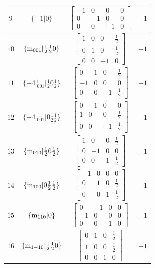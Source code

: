 \documentclass[fleqn,8pt]{jsarticle}
\begin{document}
\begin{longtable}{cccc}
$ 9 $ & $ \{-1|0\} $ & $ \begin{bmatrix} -1 & 0 & 0 & 0 \\ 0 & -1 & 0 & 0 \\ 0 & 0 & -1 & 0 \end{bmatrix} $ & $ -1 $ \\ \hline
$ 10 $ & $ \{{\rm m}_{001}|\frac{1}{2} \frac{1}{2} 0\} $ & $ \begin{bmatrix} 1 & 0 & 0 & \frac{1}{2} \\ 0 & 1 & 0 & \frac{1}{2} \\ 0 & 0 & -1 & 0 \end{bmatrix} $ & $ -1 $ \\ \hline
$ 11 $ & $ \{-4^{+}_{\,\,001}|\frac{1}{2} 0 \frac{1}{2}\} $ & $ \begin{bmatrix} 0 & 1 & 0 & \frac{1}{2} \\ -1 & 0 & 0 & 0 \\ 0 & 0 & -1 & \frac{1}{2} \end{bmatrix} $ & $ -1 $ \\ \hline
$ 12 $ & $ \{-4^{-}_{\,\,001}|0 \frac{1}{2} \frac{1}{2}\} $ & $ \begin{bmatrix} 0 & -1 & 0 & 0 \\ 1 & 0 & 0 & \frac{1}{2} \\ 0 & 0 & -1 & \frac{1}{2} \end{bmatrix} $ & $ -1 $ \\ \hline
$ 13 $ & $ \{{\rm m}_{010}|\frac{1}{2} 0 \frac{1}{2}\} $ & $ \begin{bmatrix} 1 & 0 & 0 & \frac{1}{2} \\ 0 & -1 & 0 & 0 \\ 0 & 0 & 1 & \frac{1}{2} \end{bmatrix} $ & $ -1 $ \\ \hline
$ 14 $ & $ \{{\rm m}_{100}|0 \frac{1}{2} \frac{1}{2}\} $ & $ \begin{bmatrix} -1 & 0 & 0 & 0 \\ 0 & 1 & 0 & \frac{1}{2} \\ 0 & 0 & 1 & \frac{1}{2} \end{bmatrix} $ & $ -1 $ \\ \hline
$ 15 $ & $ \{{\rm m}_{110}|0\} $ & $ \begin{bmatrix} 0 & -1 & 0 & 0 \\ -1 & 0 & 0 & 0 \\ 0 & 0 & 1 & 0 \end{bmatrix} $ & $ -1 $ \\ \hline
$ 16 $ & $ \{{\rm m}_{1-10}|\frac{1}{2} \frac{1}{2} 0\} $ & $ \begin{bmatrix} 0 & 1 & 0 & \frac{1}{2} \\ 1 & 0 & 0 & \frac{1}{2} \\ 0 & 0 & 1 & 0 \end{bmatrix} $ & $ -1 $ \\
\end{longtable}
\end{document}

